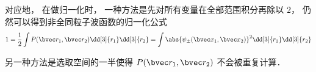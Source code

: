 对应地， 在做归一化时， 一种方法是先对所有变量在全部范围积分再除以 $2$， 仍然可以得到非全同粒子波函数的归一化公式
\begin{equation}
1 = \frac{1}{2}\int P(\bvec r_1, \bvec r_2) \dd[3]{r_1}\dd[3]{r_2} = \int \abs{\psi_\pm(\bvec x_1, \bvec x_2)}^2 \dd[3]{r_1}\dd[3]{r_2}
\end{equation}

另一种方法是选取空间的一半使得 $P(\bvec r_1, \bvec r_2)$ 不会被重复计算．


